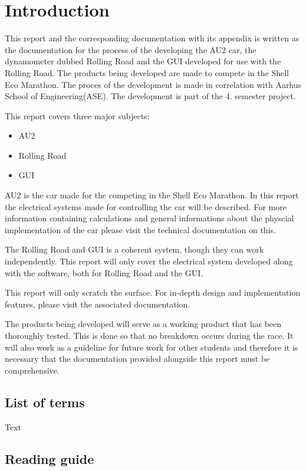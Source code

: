 \chapter{Introduction}
This report and the corresponding documentation with its appendix is written as the documentation for the process of the developing the AU2 car, the dynamometer dubbed Rolling Road and the GUI developed for use with the Rolling Road. The products being developed are made to compete in the Shell Eco Marathon. The proces of the development is made in correlation with Aarhus School of Engineering(ASE). The development is part of the 4. semester project. 

This report covers three major subjects:

\begin{itemize}
	\item{AU2}
	\item{Rolling Road}
	\item{GUI}
\end{itemize}

AU2 is the car made for the competing in the Shell Eco Marathon. In this report the electrical systems made for controlling the car will be described. For more information containing calculations and general informations about the physcial implementation of the car please visit the technical documentation on this.

The Rolling Road and GUI is a coherent system, though they can work independently. This report will only cover the electrical system developed along with the software, both for Rolling Road and the GUI. 

This report will only scratch the surface. For in-depth design and implementation features, please visit the associated documentation. 

The products being developed will serve as a working product that has been thoroughly tested. This is done so that no breakdown occurs during the race. It will also work as a guideline for future work for other students and therefore it is necessary that the documentation provided alongside this report must be comprehensive.

\section{List of terms}
Text

\section{Reading guide}

